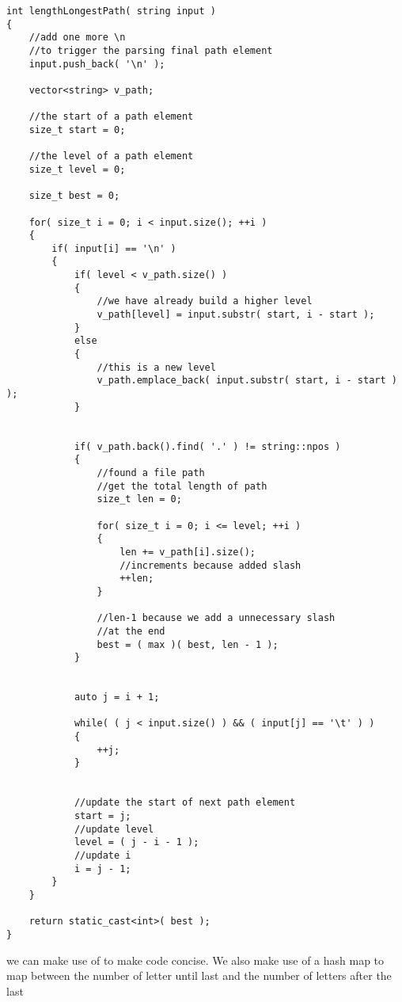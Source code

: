 \setcounter{lstlisting}{0}
\begin{lstlisting}[style=customc, caption={Tree}]
int lengthLongestPath( string input )
{
    //add one more \n
    //to trigger the parsing final path element
    input.push_back( '\n' );

    vector<string> v_path;

    //the start of a path element
    size_t start = 0;

    //the level of a path element
    size_t level = 0;

    size_t best = 0;

    for( size_t i = 0; i < input.size(); ++i )
    {
        if( input[i] == '\n' )
        {
            if( level < v_path.size() )
            {
                //we have already build a higher level
                v_path[level] = input.substr( start, i - start );
            }
            else
            {
                //this is a new level
                v_path.emplace_back( input.substr( start, i - start ) );
            }


            if( v_path.back().find( '.' ) != string::npos )
            {
                //found a file path
                //get the total length of path
                size_t len = 0;

                for( size_t i = 0; i <= level; ++i )
                {
                    len += v_path[i].size();
                    //increments because added slash
                    ++len;
                }

                //len-1 because we add a unnecessary slash
                //at the end
                best = ( max )( best, len - 1 );
            }


            auto j = i + 1;

            while( ( j < input.size() ) && ( input[j] == '\t' ) )
            {
                ++j;
            }


            //update the start of next path element
            start = j;
            //update level
            level = ( j - i - 1 );
            //update i
            i = j - 1;
        }
    }

    return static_cast<int>( best );
}
\end{lstlisting}

we can make use of  to make code concise. We also make use of a hash map to map between the number of letter until last  and the number of letters after the last 

